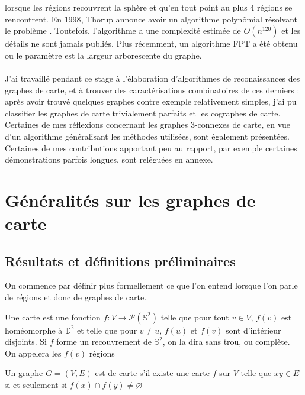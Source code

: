 \documentclass{scrartcl}
\begin{document}
\begin{flushleft}
lorsque les régions recouvrent la sphère et qu'en tout point au plus $4$ régions se rencontrent. En $1998$, Thorup annonce avoir un algorithme
polynômial résolvant le problème \cite{Thorup}. Toutefois, l'algorithme a une complexité estimée de $O(n^{120})$ \cite{n120} et les détails ne
sont jamais publiés. Plus récemment, un algorithme FPT a été obtenu \cite{FptMap} ou le paramètre est la largeur arborescente du graphe.
\\~\\
J'ai travaillé pendant ce stage à l'élaboration d'algorithmes de reconaissances des graphes de carte, et à trouver des caractérisations
combinatoires de ces derniers : après avoir trouvé quelques graphes contre exemple relativement simples, j'ai pu classifier les graphes
de carte trivialement parfaits et les cographes de carte. Certaines de mes réflexions concernant les graphes $3$-connexes de carte, en vue
d'un algorithme généralisant les méthodes utilisées, sont également présentées. Certaines de mes contributions apportant peu au rapport,
par exemple certaines démonstrations parfois longues, sont reléguées en annexe.

\section{Généralités sur les graphes de carte}

\subsection{Résultats et définitions préliminaires}

On commence par définir plus formellement ce que l'on entend lorsque l'on parle de régions et donc de graphes de carte.

\begin{def*}[Carte]
    Une carte est une fonction $f : V \rightarrow \mathcal{P}(\mathbb{S}^2)$ telle que pour tout $v \in V$, $f(v)$
    est homéomorphe à $\mathbb{D}^2$ et telle que pour $v \neq u$, $f(u)$ et $f(v)$ sont d'intérieur disjoints. Si
    $f$ forme un recouvrement de $\mathbb{S}^2$, on la dira sans trou, ou complète. On appelera les $f(v)$ régions
\end{def*}

\begin{def*}
    Un graphe $G = (V, E)$ est de carte s'il existe une carte $f$ sur $V$ telle que $xy \in E$ si et seulement si
    $f(x) \cap f(y) \neq \varnothing$
\end{def*}


\end{flushleft}
\end{document}
